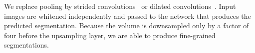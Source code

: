 \begin{comment}
\begin{table}[h]
	\centering
	\begin{tabular}{lcccccr}
	\hline
	\textbf{Layer} & \textbf{Filter} & \textbf{Stride} & \textbf{Pad} & \textbf{Dilation} & \textbf{Volume} & \textbf{Parameters} \\ %
	\hline
	\texttt{INPUT}	&- & -	& - & - & $128 \times 128 \times 1$ & -\\
	\texttt{CONV -> LRELU}	& $6 \times 6$ & 2 & 2 & 1 & $64 \times 64 \times 32$ & 1\,184\\ %
	\texttt{CONV -> LRELU}	& $3 \times 3$ & 1 & 1 & 1 & $64 \times 64 \times 32$ & 9\,248\\ %
	\texttt{CONV -> LRELU}	& $3 \times 3$ & 1 & 2 & 2 & $64 \times 64 \times 64$ & 18\,496\\ %
	\texttt{CONV -> LRELU}	& $3 \times 3$ & 1 & 2 & 2 & $64 \times 64 \times 64$ & 36\,928\\ %
	\texttt{CONV -> LRELU}	& $3 \times 3$ & 1 & 4 & 4 & $64 \times 64 \times 128$ & 73\,856\\ %
	\texttt{CONV -> LRELU}	& $3 \times 3$ & 1 & 4 & 4 & $64 \times 64 \times 128$ & 147\,584\\ %
	\texttt{CONV -> LRELU}	& $3 \times 3$ & 1 & 4 & 4 & $64 \times 64 \times 128$ & 147\,584\\ %
	\texttt{CONV -> LRELU}	& $3 \times 3$ & 1 & 4 & 4 & $64 \times 64 \times 128$ & 147\,584\\ %
	\texttt{CONV -> LRELU}	& $3 \times 3$ & 1 & 8 & 8 & $64 \times 64 \times 256$ & 295\,168\\ %
	\texttt{CONV}	& $8 \times 8$ & 1 & 28 & 8 & $64 \times 64 \times 1$ & 16\,385\\ %
	\texttt{BILINEAR (x2)}		& - & - && - & $128 \times 128 \times 1$ & -\\
	\hline
	\end{tabular}
	\caption[Convolutional network architecture for Experiment 3]{Architecture of the network used for experiments. It shows the filter size, stride, dilation and padding in each layer as well as the resulting volume and number of learnable parameters per layer. \texttt{LRELU} stands for leaky ReLU.}
	\label{tab:convNetArchitecture3}
\end{table}
\end{comment}

	 We replace pooling by strided convolutions~\cite{Szegedy2014} or dilated convolutions~\cite{Chen2015}. Input images are whitened independently and passed to the network that produces the predicted segmentation. Because the volume is downsampled only by a factor of four before the upsampling layer, we are able to produce fine-grained segmentations.
	 
